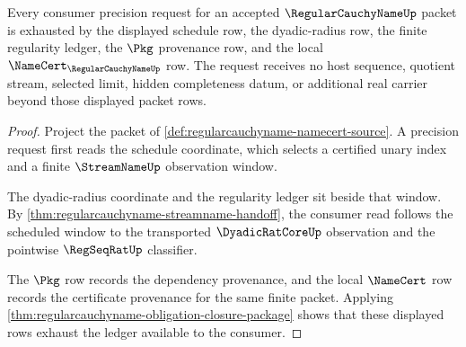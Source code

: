 \begin{theorem}
\label{thm:regularcauchyname-finite-window-ledger-exhaustion}
Every consumer precision request for an accepted $\RegularCauchyNameUp$ packet is exhausted by the displayed schedule row, the dyadic-radius row, the finite regularity ledger, the $\Pkg$ provenance row, and the local $\NameCert_{\RegularCauchyNameUp}$ row. The request receives no host sequence, quotient stream, selected limit, hidden completeness datum, or additional real carrier beyond those displayed packet rows.
\end{theorem}
\begin{proof}
Project the packet of \autoref{def:regularcauchyname-namecert-source}. A precision request first reads the schedule coordinate, which selects a certified unary index and a finite $\StreamNameUp$ observation window.

The dyadic-radius coordinate and the regularity ledger sit beside that window. By \autoref{thm:regularcauchyname-streamname-handoff}, the consumer read follows the scheduled window to the transported $\DyadicRatCoreUp$ observation and the pointwise $\RegSeqRatUp$ classifier.

The $\Pkg$ row records the dependency provenance, and the local $\NameCert$ row records the certificate provenance for the same finite packet. Applying \autoref{thm:regularcauchyname-obligation-closure-package} shows that these displayed rows exhaust the ledger available to the consumer.
\end{proof}

